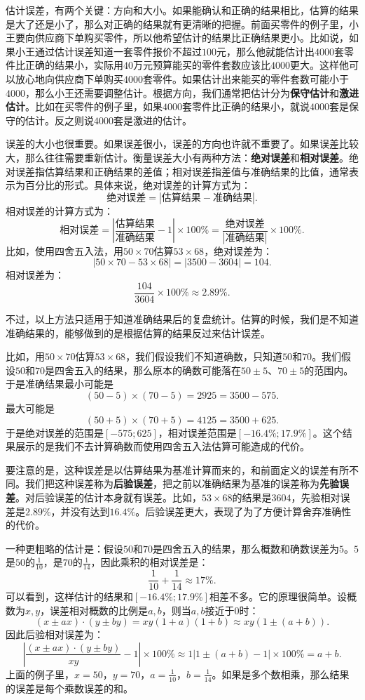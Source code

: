 \documentclass[12pt,UTF8,fontset=none]{ctexbook}
\begin{document}
估计误差，有两个关键：方向和大小。如果能确认和正确的结果相比，估算的结果是大了还是小了，那么对正确的结果就有更清晰的把握。前面买零件的例子里，小王要向供应商下单购买零件，所以他希望估计的结果比正确结果更小。比如说，如果小王通过估计误差知道一套零件报价不超过$100$元，那么他就能估计出$4000$套零件比正确的结果小，实际用$40$万元预算能买的零件套数应该比$4000$更大。这样他可以放心地向供应商下单购买$4000$套零件。如果估计出来能买的零件套数可能小于$4000$，那么小王还需要调整估计。根据方向，我们通常把估计分为\textbf{保守估计}和\textbf{激进估计}。比如在买零件的例子里，如果$4000$套零件比正确的结果小，就说$4000$套是保守的估计。反之则说$4000$套是激进的估计。

误差的大小也很重要。如果误差很小，误差的方向也许就不重要了。如果误差比较大，那么往往需要重新估计。衡量误差大小有两种方法：\textbf{绝对误差}和\textbf{相对误差}。绝对误差指估算结果和正确结果的差值；相对误差指差值与准确结果的比值，通常表示为百分比的形式。具体来说，绝对误差的计算方式为：
$$ \text{绝对误差} = \left|\text{估算结果} - \text{准确结果}\right|. $$
相对误差的计算方式为：
$$ \text{相对误差} = \left|\frac{\text{估算结果}}{\text{准确结果}} - 1\right| \times 100\% = \frac{\text{绝对误差}}{|\text{准确结果}|} \times 100\%. $$
比如，使用四舍五入法，用$50\times 70$估算$53 \times 68$，绝对误差为：
$$  \left|50\times 70 - 53 \times 68\right| = |3500 - 3604| = 104. $$
相对误差为：
$$ \frac{104}{3604} \times 100\% \approx 2.89\%. $$

不过，以上方法只适用于知道准确结果后的复盘统计。估算的时候，我们是不知道准确结果的，能够做到的是根据估算的结果反过来估计误差。

比如，用$50\times 70$估算$53 \times 68$，我们假设我们不知道确数，只知道$50$和$70$。我们假设$50$和$70$是四舍五入的结果，那么原本的确数可能落在$50\pm 5$、$70\pm 5$的范围内。于是准确结果最小可能是
$$ (50 - 5) \times (70 - 5) = 2925 = 3500 - 575.$$
最大可能是
$$ (50 + 5) \times (70 + 5) = 4125 = 3500 + 625.$$
于是绝对误差的范围是$[- 575; 625]$，相对误差范围是$[-16.4\%;17.9\%]$。这个结果展示的是我们不去计算确数而使用四舍五入法估算可能造成的代价。

要注意的是，这种误差是以估算结果为基准计算而来的，和前面定义的误差有所不同。我们把这种误差称为\textbf{后验误差}，把之前以准确结果为基准的误差称为\textbf{先验误差}。对后验误差的估计本身就有误差。比如，$53 \times 68$的结果是$3604$，先验相对误差是$2.89\%$，并没有达到$16.4\%$。后验误差更大，表现了为了方便计算舍弃准确性的代价。

一种更粗略的估计是：假设$50$和$70$是四舍五入的结果，那么概数和确数误差为$5$。$5$是$50$的$\frac{1}{10}$，是$70$的$\frac{1}{14}$，因此乘积的相对误差是：
$$ \frac{1}{10} + \frac{1}{14} \approx 17\%. $$
可以看到，这样估计的结果和$[-16.4\%;17.9\%]$相差不多。它的原理很简单。设概数为$x,y$，误差相对概数的比例是$a,b$，则当$a,b$接近于$0$时：
$$ (x \pm ax) \cdot (y \pm by) = xy (1 + a)(1 + b) \approx xy(1 \pm (a + b)).$$
因此后验相对误差为：
$$ \left|\frac{(x \pm ax) \cdot (y \pm by)}{xy} - 1\right| \times 100\% \approx 1  \left| 1 \pm (a + b) - 1\right| \times 100\%  = a + b. $$
上面的例子里，$x = 50$，$y = 70$，$a = \frac{1}{10}$，$b = \frac{1}{14}$。如果是多个数相乘，那么结果的误差是每个乘数误差的和。
\end{document}
